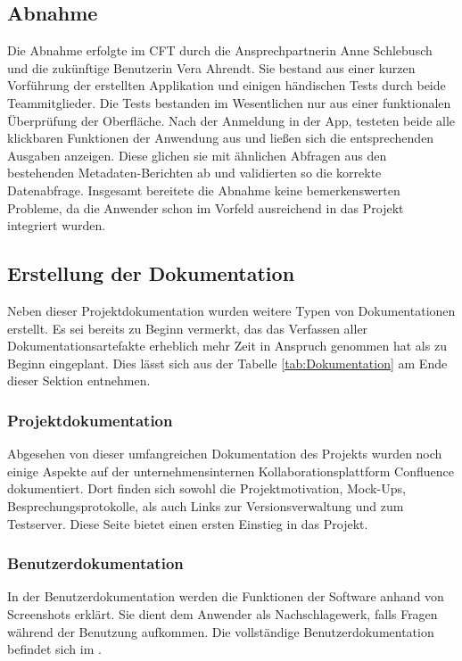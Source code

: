 \subsection{Abnahme}
\label{sec:Abnahme}
Die Abnahme erfolgte im \ac{CFT} \teamName durch die Ansprechpartnerin Anne Schlebusch und die zukünftige Benutzerin Vera Ahrendt. Sie bestand aus einer kurzen Vorführung der erstellten Applikation und einigen händischen Tests durch beide Teammitglieder. Die Tests bestanden im Wesentlichen nur aus einer funktionalen Überprüfung der Oberfläche. Nach der Anmeldung in der App, testeten beide alle klickbaren Funktionen der Anwendung aus und ließen sich die entsprechenden Ausgaben anzeigen. Diese glichen sie mit ähnlichen Abfragen aus den bestehenden Metadaten-Berichten ab und validierten so die korrekte Datenabfrage. Insgesamt bereitete die Abnahme keine bemerkenswerten Probleme, da die Anwender schon im Vorfeld ausreichend in das Projekt integriert wurden.

\subsection{Erstellung der Dokumentation}
\label{sec:Dokumentation}
Neben dieser Projektdokumentation wurden weitere Typen von Dokumentationen erstellt. Es sei bereits zu Beginn vermerkt, das das Verfassen aller Dokumentationsartefakte erheblich mehr Zeit in Anspruch genommen hat als zu Beginn eingeplant. Dies lässt sich aus der Tabelle \ref{tab:Dokumentation} am Ende dieser Sektion entnehmen.

\subsubsection{Projektdokumentation}
\label{sec:Projektdokumentation}
Abgesehen von dieser umfangreichen Dokumentation des Projekts wurden noch einige Aspekte auf der unternehmensinternen Kollaborationsplattform Confluence dokumentiert. Dort finden sich sowohl die Projektmotivation, Mock-Ups, Besprechungsprotokolle, als auch \ua Links zur Versionsverwaltung und zum Testserver. Diese Seite bietet einen ersten Einstieg in das Projekt.

\subsubsection{Benutzerdokumentation}
\label{sec:Benutzerdokumentation}
In der Benutzerdokumentation werden die Funktionen der Software anhand von Screenshots erklärt. Sie dient dem Anwender als Nachschlagewerk, falls Fragen während der Benutzung aufkommen. Die vollständige Benutzerdokumentation befindet sich im .

